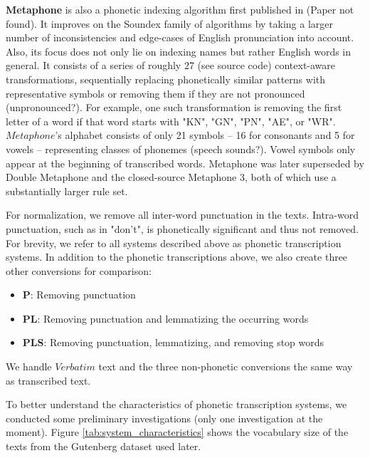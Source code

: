 \textbf{Metaphone} is also a phonetic indexing algorithm first published in \cite{philips1990metaphone} (Paper not found).
It improves on the Soundex family of algorithms by taking a larger number of inconsistencies and edge-cases of English pronunciation into account.
Also, its focus does not only lie on indexing names but rather English words in general.
It consists of a series of roughly 27 (see source code) context-aware transformations, sequentially replacing phonetically similar patterns with representative symbols or removing them if they are not pronounced (unpronounced?).
For example, one such transformation is removing the first letter of a word if that word starts with "KN", "GN", "PN", "AE", or "WR".
$Metaphone$'s alphabet consists of only 21 symbols -- 16 for consonants and 5 for vowels -- representing classes of phonemes (speech sounds?).
Vowel symbols only appear at the beginning of transcribed words.
Metaphone was later superseded by Double Metaphone and the closed-source Metaphone 3, both of which use a substantially larger rule set.

For normalization, we remove all inter-word punctuation in the texts.
Intra-word punctuation, such as in "don't", is phonetically significant and thus not removed.
For brevity, we refer to all systems described above as phonetic transcription systems.
In addition to the phonetic transcriptions above, we also create three other conversions for comparison:
\begin{itemize}
  \item \textbf{P}: Removing punctuation
  \item \textbf{PL}: Removing punctuation and lemmatizing the occurring words
  \item \textbf{PLS}: Removing punctuation, lemmatizing, and removing stop words
\end{itemize}
We handle $Verbatim$ text and the three non-phonetic conversions the same way as transcribed text.


To better understand the characteristics of phonetic transcription systems, we conducted some preliminary investigations (only one investigation at the moment).
Figure \ref{tab:system_characteristics} shows the vocabulary size of the texts from the Gutenberg dataset used later.



